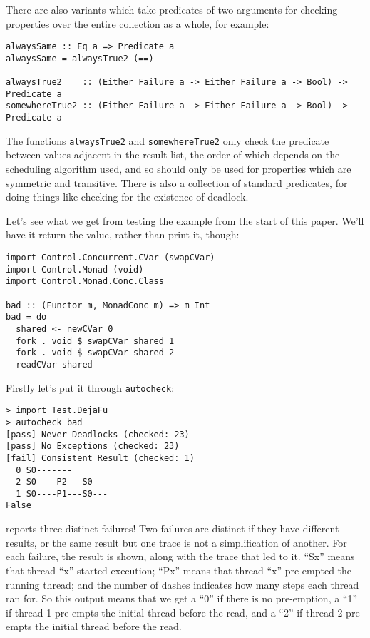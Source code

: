 There are also variants which take predicates of two arguments for
checking properties over the entire collection as a whole, for
example:

\begin{verbatim}
alwaysSame :: Eq a => Predicate a
alwaysSame = alwaysTrue2 (==)

alwaysTrue2    :: (Either Failure a -> Either Failure a -> Bool) -> Predicate a
somewhereTrue2 :: (Either Failure a -> Either Failure a -> Bool) -> Predicate a
\end{verbatim}

The functions \texttt{alwaysTrue2} and \texttt{somewhereTrue2} only
check the predicate between values adjacent in the result list, the
order of which depends on the scheduling algorithm used, and so should
only be used for properties which are symmetric and transitive. There
is also a collection of standard predicates, for doing things like
checking for the existence of deadlock.

Let's see what we get from testing the example from the start of this
paper. We'll have it return the value, rather than print it, though:

\begin{verbatim}
import Control.Concurrent.CVar (swapCVar)
import Control.Monad (void)
import Control.Monad.Conc.Class

bad :: (Functor m, MonadConc m) => m Int
bad = do
  shared <- newCVar 0
  fork . void $ swapCVar shared 1
  fork . void $ swapCVar shared 2
  readCVar shared
\end{verbatim}

Firstly let's put it through \texttt{autocheck}:

\begin{verbatim}
> import Test.DejaFu
> autocheck bad
[pass] Never Deadlocks (checked: 23)
[pass] No Exceptions (checked: 23)
[fail] Consistent Result (checked: 1)
  0 S0-------
  2 S0----P2---S0---
  1 S0----P1---S0---
False
\end{verbatim}

\dejafu{} reports three distinct failures! Two failures are distinct
if they have different results, or the same result but one trace is
not a simplification of another. For each failure, the result is
shown, along with the trace that led to it. ``Sx'' means that thread
``x'' started execution; ``Px'' means that thread ``x'' pre-empted the
running thread; and the number of dashes indicates how many steps each
thread ran for. So this output means that we get a ``0'' if there is
no pre-emption, a ``1'' if thread 1 pre-empts the initial thread
before the read, and a ``2'' if thread 2 pre-empts the initial thread
before the read.

